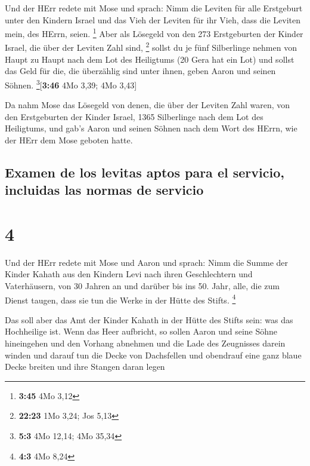  Und der HErr redete mit Mose und sprach: 
Nimm die Leviten für alle Erstgeburt unter den Kindern Israel und das
Vieh der Leviten für ihr Vieh, dass die Leviten mein, des HErrn, seien.
\footnote{\textbf{3:45} 4Mo 3,12}  Aber als Lösegeld von
den 273 Erstgeburten der Kinder Israel, die über der Leviten Zahl sind,
\footnote{\textbf{22:23} 1Mo 3,24; Jos 5,13}  sollst du
je fünf Silberlinge nehmen von Haupt zu Haupt nach dem Lot des
Heiligtums (20 Gera hat ein Lot)  und sollst das Geld für
die, die überzählig sind unter ihnen, geben Aaron und seinen Söhnen.
\footnote{\textbf{5:3} 4Mo 12,14; 4Mo 35,34}{[}\textbf{3:46} 4Mo 3,39;
4Mo 3,43{]}

 Da nahm Mose das Lösegeld von denen, die über der
Leviten Zahl waren,  von den Erstgeburten der Kinder
Israel, 1365 Silberlinge nach dem Lot des Heiligtums, 
und gab's Aaron und seinen Söhnen nach dem Wort des HErrn, wie der HErr
dem Mose geboten hatte.

\hypertarget{examen-de-los-levitas-aptos-para-el-servicio-incluidas-las-normas-de-servicio}{%
\subsection{Examen de los levitas aptos para el servicio, incluidas las
normas de
servicio}\label{examen-de-los-levitas-aptos-para-el-servicio-incluidas-las-normas-de-servicio}}

\hypertarget{section-3}{%
\section{4}\label{section-3}}

 Und der HErr redete mit Mose und Aaron und sprach:
 Nimm die Summe der Kinder Kahath aus den Kindern Levi
nach ihren Geschlechtern und Vaterhäusern,  von 30 Jahren
an und darüber bis ins 50. Jahr, alle, die zum Dienst taugen, dass sie
tun die Werke in der Hütte des Stifts. \footnote{\textbf{4:3} 4Mo 8,24}

 Das soll aber das Amt der Kinder Kahath in der Hütte des
Stifts sein: was das Hochheilige ist.  Wenn das Heer
aufbricht, so sollen Aaron und seine Söhne hineingehen und den Vorhang
abnehmen und die Lade des Zeugnisses darein winden  und
darauf tun die Decke von Dachsfellen und obendrauf eine ganz blaue Decke
breiten und ihre Stangen daran legen

